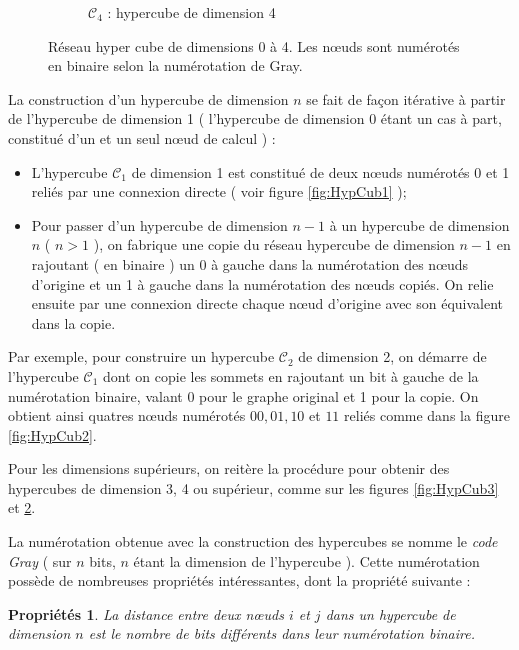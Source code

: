 \documentclass[fleqn,11pt]{article}
\newtheorem{prop}{Propriétés }
\begin{document}
\begin{figure}[h]
\begin{subfigure}[c]{0.46\textwidth}
\caption{$\mathcal{C}_{4}$ : hypercube de dimension 4}\label{fig:HypCub4}
\end{subfigure}
\caption{Réseau hyper cube de dimensions 0 à 4. Les nœuds sont numérotés en binaire selon la numérotation de Gray.}
\end{figure}

La construction d'un hypercube de dimension $n$ se fait de façon itérative à partir de l'hypercube de
dimension 1 ( l'hypercube de dimension 0 étant un cas à part, constitué d'un et un seul nœud de calcul ) :

\begin{itemize}
\item L'hypercube $\mathcal{C}_{1}$ de dimension 1 est constitué de deux nœuds numérotés 0 et 1 
reliés par une connexion directe ( voir figure \ref{fig:HypCub1} );
\item Pour passer d'un hypercube de dimension $n-1$ à un hypercube de dimension $n$ ( $n>1$ ), on fabrique
une copie du réseau hypercube de dimension $n-1$ en rajoutant ( en binaire ) un 0 à gauche dans la numérotation
des nœuds d'origine et un 1 à gauche dans la numérotation des nœuds copiés. On relie ensuite par une
connexion directe chaque nœud d'origine avec son équivalent dans la copie.
\end{itemize}

Par exemple, pour construire un hypercube $\mathcal{C}_{2}$ de dimension 2, 
on démarre de l'hypercube $\mathcal{C}_{1}$ dont on copie les sommets en rajoutant
un bit à gauche de la numérotation binaire, valant 0 pour le graphe original et
1 pour la copie. On obtient ainsi quatres nœuds numérotés $00,01,10$ et $11$
reliés comme dans la figure \ref{fig:HypCub2}.

Pour les dimensions supérieurs, on reitère la procédure pour obtenir des hypercubes de dimension
3, 4 ou supérieur, comme sur les figures \ref{fig:HypCub3} et \ref{fig:HypCub4}.

La numérotation obtenue avec la construction des hypercubes se nomme le \textsl{code Gray} ( sur $n$
bits, $n$ étant la dimension de l'hypercube ). Cette numérotation possède de nombreuses propriétés
intéressantes, dont la propriété suivante :

\begin{prop}
La distance entre deux nœuds $i$ et $j$ dans un hypercube de dimension $n$ est le nombre de bits différents
dans leur numérotation binaire.
\end{prop}
\end{document}
